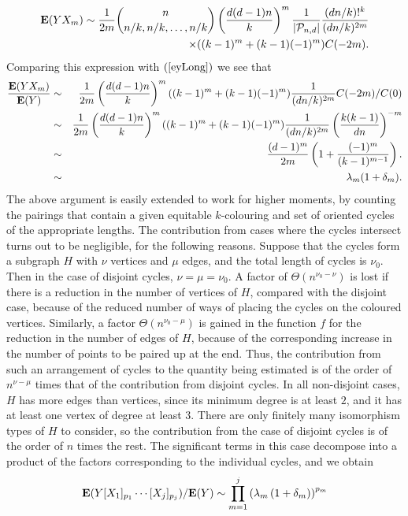 \documentclass[12pt]{article}
\def\P{{\cal P}}
\def\ex{{\bf E}}
\def\Pnd{\P_{n,d}}
\newcommand{\eqn}[1]{(\ref{#1})}
\begin{document}
%
\begin{eqnarray*}
\ex (YX_m) \sim
\frac{1}{2m}
\binom{n}{n/k, n/k, \ldots, n/k}
\left(\frac{ d(d-1)n}{k}\right)^m
\frac{1}{\left| \Pnd \right|}
\frac{(dn/k)!^k}{(dn/k)^{2m}}
\\
\times
((k-1)^m + (k-1)(-1)^m)
C(-2m).
\end{eqnarray*}
Comparing this expression with $\eqn{eyLong}$ we see that
\begin{eqnarray*}
\frac{ \ex (YX_m) }{ \ex (Y) }
&\sim&
\frac{1}{2m}
\left(\frac{ d(d-1)n}{k}\right)^m
((k-1)^m + (k-1)(-1)^m)
\frac{1}{(dn/k)^{2m}}
C(-2m)/C(0)
\\
&\sim&
\frac{1}{2m}
\left(\frac{ d(d-1)n}{k}\right)^m
((k-1)^m + (k-1)(-1)^m)
\frac{1}{(dn/k)^{2m}}
\left(\frac{ k(k-1) }{ dn } \right)^{-m}
\\
&\sim&
\frac{(d-1)^m}{2m}
\left(1 + \frac{(-1)^m}{(k-1)^{m-1}}\right).
\\
&\sim&
\lambda_m
(1 + \delta_m).
\end{eqnarray*}
%
%
The above argument is easily extended to work for higher moments, by counting the pairings that contain a given equitable
$k$-colouring and set of oriented cycles of the appropriate lengths. The contribution from cases where the cycles intersect turns out to be negligible, for the following reasons. Suppose that the cycles form a subgraph $H$ with $\nu$ vertices and $\mu$ edges, and the total length of cycles is $\nu_0$. Then in the case of disjoint cycles, $\nu=\mu=\nu_0$. A factor of $\Theta(n^{\nu_0-\nu})$ is lost if there is a reduction in the number of vertices of $H$, compared with the disjoint case, because of the reduced number of ways of placing the cycles on the coloured vertices. Similarly, a factor $\Theta(n^{\nu_0-\mu})$ is gained in the function $f$ for the reduction in the number of edges of $H$, because of the corresponding increase in the number of points to be paired up at the end.   
Thus, the contribution from such an arrangement of cycles to the quantity being estimated is of the order of $n^{\nu-\mu}$ times that of the contribution from disjoint cycles.  In all non-disjoint cases, $H$ has more edges than vertices, since its minimum degree is at least $2$, and it has at least one vertex of degree at least $3$. There are only finitely many isomorphism types of $H$ to consider, so the contribution from the case of disjoint cycles is of the order of $n$ times the rest. The significant terms in this case decompose into a product of the factors corresponding to the individual cycles, and we obtain
$$
\ex(Y[X_1]_{p_1}\cdots [X_j]_{p_j}) / \ex (Y) \sim
\prod_{m=1}^j \left( \lambda_m \left( 1 + \delta_m \right)\right)^{p_m}
$$
\end{document}
